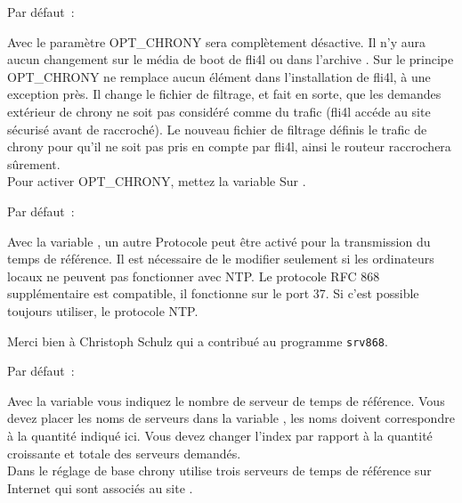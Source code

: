 \begin{description}


  Par défaut~: 

  Avec le paramètre  OPT\_CHRONY sera complètement désactive. Il n'y
  aura aucun changement sur le média de boot de fli4l ou dans l'archive
  . Sur le principe OPT\_CHRONY ne remplace aucun élément dans
  l'installation de fli4l, à une exception près. Il change le fichier de filtrage,
  et fait en sorte, que les demandes extérieur de chrony ne soit pas considéré
  comme du trafic (fli4l accéde au site sécurisé avant de raccroché).
  Le nouveau fichier de filtrage définis le trafic de chrony pour qu'il ne soit
  pas pris en compte par fli4l, ainsi le routeur raccrochera sûrement. \\
  Pour activer OPT\_CHRONY, mettez la variable  Sur .


  Par défaut~: 

  Avec la variable , un autre Protocole peut être activé
  pour la transmission du temps de référence. Il est nécessaire de le modifier
  seulement si les ordinateurs locaux ne peuvent pas fonctionner avec NTP. Le
  protocole RFC 868 supplémentaire est compatible, il fonctionne sur le port 37.
  Si c'est possible toujours utiliser, le protocole NTP.

  Merci bien à Christoph Schulz qui a contribué au programme \texttt{srv868}.


  Par défaut~: 

  Avec la variable  vous indiquez le nombre de serveur
  de temps de référence. Vous devez placer les noms de serveurs dans la variable
  , les noms doivent correspondre à la quantité indiqué
  ici. Vous devez changer l'index  par rapport à la quantité croissante et
  totale des serveurs demandés.\\
  Dans le réglage de base chrony utilise trois serveurs de temps de référence
  sur Internet qui sont associés au site .



\end{description}
